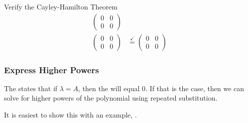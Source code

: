\begin{example}{Verify the Cayley-Hamilton Theorem}
\begin{align*}
\begin{pmatrix}
                            0 & 0 \\
                            0 & 0
                          \end{pmatrix} \\
    \begin{pmatrix}
      0 & 0 \\
      0 & 0
    \end{pmatrix} &\overset{\checkmark}{=}
                    \begin{pmatrix}
                      0 & 0 \\
                      0 & 0
                    \end{pmatrix}
  \end{align*}
\end{example}

\subsubsection{Express Higher Powers}\label{subsubsec:Cayley-Hamilton_Express_Higher_Powers}
The  states that if $\lambda = A$, then the  will equal 0.
If that is the case, then we can solve for higher powers of the polynomial using repeated substitution.

It is easiest to show this with an example, .

